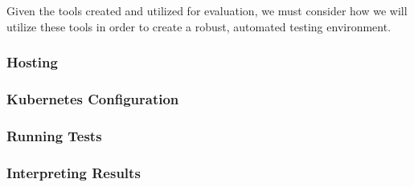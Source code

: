 Given the tools created and utilized for evaluation, we must consider how we
will utilize these tools in order to create a robust, automated testing
environment.

\subsubsection{Hosting}



\subsubsection{Kubernetes Configuration}



\subsubsection{Running Tests}



\subsubsection{Interpreting Results}


